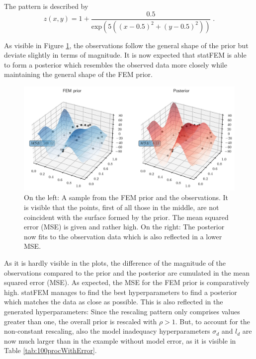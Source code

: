 \documentclass[%
  a4paper,oneside,%
  11pt,%
  smallchapters,
  style=printdev,
  extramargin,
  green,%
  rgb, <cmyk>
  ]{tubsbook}
\begin{document}
The pattern is described by
\begin{equation}
z(x,y) = 1+\frac{0.5}{\mathrm{exp}(5((x-0.5)^2 + (y-0.5)^2))} \;.
\end{equation}

As visible in Figure \ref{fig:ObservationPriorPost}, the observations follow the general shape of the prior but deviate slightly in terms of magnitude. It is now expected that statFEM is able to form a posterior which resembles the observed data more closely while maintaining the general shape of the FEM prior.
\begin{figure}[!ht]
\includegraphics[width=1\textwidth]{pics/3dTest.pdf}
\centering
\caption[Comparison of prior and posterior in a 3D view for the observations with model error]{On the left: A sample from the FEM prior and the observations. It is visible that the points, first of all those in the middle, are not coincident with the surface formed by the prior. The mean squared error (MSE) is given and rather high. On the right: The posterior now fits to the observation data which is also reflected in a lower MSE.}
\label{fig:ObservationPriorPost}
\end{figure}
As it is hardly visible in the plots, the difference of the magnitude of the observations compared to the prior and the posterior are cumulated in the mean squared error (MSE). As expected, the MSE for the FEM prior is comparatively high. statFEM manages to find the best hyperparameters to find a posterior which matches the data as close as possible. 
This is also reflected in the generated hyperparameters: Since the rescaling pattern only comprises values greater than one, the overall prior is rescaled with $\rho > 1$. But, to account for the non-constant rescaling, also the model inadequacy hyperparameters $\sigma_d$ and $l_d$ are now much larger than in the example without model error, as it is visible in Table \ref{tab:100procWithError}.
\end{document}
